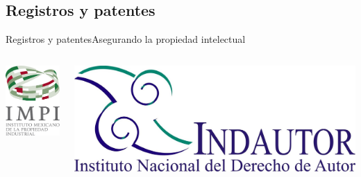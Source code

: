 \documentclass{beamer}
\begin{document}
    \subsection{Registros y patentes}
    \begin{frame}{Registros y patentes}{Asegurando la propiedad intelectual}
        \begin{columns}
            \includegraphics[width=\columnwidth,height=\columnwidth]{impi}
    
            \includegraphics[width=\columnwidth,height=\columnwidth]{indautor}
        \end{columns}
    \end{frame}
\end{document}
